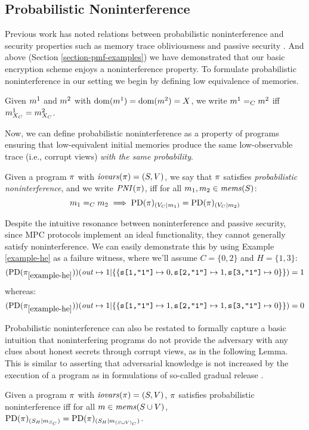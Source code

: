 \subsection{Probabilistic Noninterference}
\label{section-hyperprop-ni}
Previous work has noted
relations between probabilistic noninterference and security
properties such as memory trace obliviousness \cite{darais2019language} and passive
security \cite{barthe2019probabilistic}. And above (Section \ref{section-pmf-examples}) we
have demonstrated that our basic encryption scheme enjoys a noninterference
property. To formulate probabilistic noninterference in
our setting we begin by defining low equivalence of memories.
\begin{definition}
  Given $m^1$ and $m^2$ with $\mathrm{dom}(m^1) = \mathrm{dom}(m^2) = X$,
  we write $m^1 =_C m^2$ iff $m^1_{X_C} = m^2_{X_C}$.
\end{definition}
Now, we can define probabilistic noninterference as a property of
programs ensuring that low-equivalent initial memories produce
the same low-observable trace (i.e., corrupt views) \emph{with the
same probability}. 
\begin{definition}
  \label{definition-PNI}
  Given a program $\pi$ with $\mathit{iovars}(\pi) = (S,V)$, we say that
  $\pi$ satisfies \emph{probabilistic noninterference}, and we write
  $\mathit{PNI}(\pi)$, iff for all
  $m_1, m_2 \in \mathit{mems}(S)$:
  $$m_1 =_C m_2 \implies
    \mathrm{PD}(\pi)_{({V_C}|{m_1})} = \mathrm{PD}(\pi)_{({V_C}|{m_2})}$$
\end{definition}

Despite the intuitive resonance between noninterference
and passive security, since MPC
protocols implement an ideal functionality, they cannot generally satisfy
noninterference. We can easily demonstrate this by using
Example \ref{example-he} as a failure witness, where we'll
assume $C = \{0,2\}$ and $H = \{1,3\}$:
$$
(\mathrm{PD}(\pi_{\ref{example-he}}))({\mathit{out} \mapsto 1}|\{\{\texttt{s[1,"1"]} \mapsto 0, \texttt{s[2,"1"]} \mapsto 1, \texttt{s[3,"1"]} \mapsto 0 \} \})
= 1
$$
whereas:
$$
(\mathrm{PD}(\pi_{\ref{example-he}}))({\mathit{out} \mapsto 1}|\{\{\texttt{s[1,"1"]} \mapsto 1, \texttt{s[2,"1"]} \mapsto 1, \texttt{s[3,"1"]} \mapsto 0 \} \})
= 0
$$

Probabilistic noninterference can also be restated to formally capture a
basic intuition that noninterfering programs do not provide
the adversary with any clues about honest secrets through corrupt
views, as in the following Lemma. This is similar to asserting that
adversarial knowledge is not increased by the execution of a program as in formulations
of so-called gradual release \cite{4223226}. 
\begin{lemma}
  \label{lemma-pni}
  Given a program $\pi$ with $\mathit{iovars}(\pi) = (S,V)$, 
  $\pi$ satisfies probabilistic noninterference iff for all
  $m \in \mathit{mems}(S \cup V)$,
  $\mathrm{PD}(\pi)_{({S_H}|{m_{S_C}})} =
    \mathrm{PD}(\pi)_{({S_H}|{m_{(S\cup V)_C}})}$.
\end{lemma}


